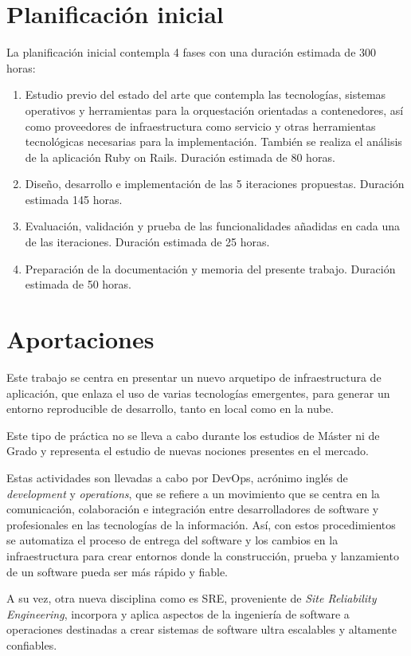 \section{Planificación inicial}

La planificación inicial contempla 4 fases con una duración estimada de 300 horas:
\begin{enumerate}
\item Estudio previo del estado del arte que contempla las tecnologías, sistemas operativos y herramientas para la orquestación orientadas a contenedores, así como proveedores de infraestructura como servicio y otras herramientas tecnológicas necesarias para la implementación. También se realiza el análisis de la aplicación Ruby on Rails. Duración estimada de 80 horas.
\item Diseño, desarrollo e implementación de las 5 iteraciones propuestas. Duración estimada 145 horas.
\item Evaluación, validación y prueba de las funcionalidades añadidas en cada una de las iteraciones. Duración estimada de 25 horas.
\item Preparación de la documentación y memoria del presente trabajo. Duración estimada de 50 horas.
\end{enumerate}

\section{Aportaciones}

Este trabajo se centra en presentar un nuevo arquetipo de infraestructura de aplicación, que enlaza el uso de varias tecnologías emergentes, para generar un entorno reproducible de desarrollo, tanto en local como en la nube. 

Este tipo de práctica no se lleva a cabo durante los estudios de Máster ni de Grado y representa el estudio de nuevas nociones presentes en el mercado. 

Estas actividades son llevadas a cabo por DevOps, acrónimo inglés de \textit{development} y \textit{operations}, que se refiere a un movimiento que se centra en la comunicación, colaboración e integración entre desarrolladores de software y profesionales en las tecnologías de la información. Así, con estos procedimientos se automatiza el proceso de entrega del software y los cambios en la infraestructura para crear entornos donde la construcción, prueba y lanzamiento de un software pueda ser más rápido y fiable. 

A su vez, otra nueva disciplina como es SRE, proveniente de \textit{Site Reliability Engineering}, incorpora y aplica aspectos de la ingeniería de software a operaciones destinadas a crear sistemas de software ultra escalables y altamente confiables. 

